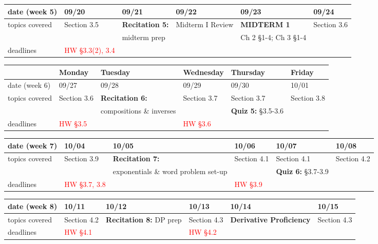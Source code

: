 \documentclass[11pt,fleqn]{article}
\begin{document}
\vfill
\begin{tabularx}{\textwidth}{|X|| X | X | X | X | X |}
\hline
\rowcolor{gray!20}
date (week 5)&09/20&09/21&09/22&09/23&09/24\\ \hline
topics covered&Section 3.5&\textbf{Recitation 5:} &Midterm I Review&\textcolor{dcyan}{\textbf{MIDTERM 1}}&Section 3.6\\
&&midterm prep&&Ch 2 \S 1-4; Ch 3 \S 1-4&\\ \hline
deadlines&\textcolor{red}{HW \S 3.3(2), 3.4}&&&& \\  \hline \hline
\end{tabularx}
\vfill
\newpage

\begin{tabularx}{\textwidth}{|X|| X | X | X | X | X |}
\hline
&Monday & Tuesday & Wednesday & Thursday & Friday \\
\hline \hline
\rowcolor{gray!20}
date (week 6)&09/27&09/28&09/29&09/30&10/01\\ \hline
topics covered&Section 3.6&\textbf{Recitation 6:}&Section 3.7&Section 3.7&Section 3.8\\ 
&&compositions \& inverses&&\textbf{Quiz 5:} \S 3.5-3.6&\\ \hline
deadlines&\textcolor{red}{HW \S3.5}&&\textcolor{red}{HW \S 3.6}&& \\ \hline
\end{tabularx}
\vfill
\begin{tabularx}{\textwidth}{|X|| X | X | X | X | X |}
\hline
\rowcolor{gray!20}
date (week 7)&10/04&10/05&10/06&10/07&10/08\\ \hline
topics covered&Section 3.9&\textbf{Recitation 7:}&Section 4.1&Section 4.1&Section 4.2\\ 
&&exponentials \& word problem set-up&&\textbf{Quiz 6:} \S 3.7-3.9&\\ \hline
deadlines&\textcolor{red}{HW \S 3.7, 3.8}& &\textcolor{red}{HW \S 3.9}&& \\\hline 
\end{tabularx}
\vfill
\begin{tabularx}{\textwidth}{|X|| X | X | X | X | X |}
\hline
\rowcolor{gray!20}
date (week 8)&10/11&10/12&10/13&10/14&10/15\\ \hline
topics covered&Section 4.2&\textbf{Recitation 8:} DP prep&Section 4.3&\textcolor{dcyan}{\textbf{Derivative Proficiency}}&Section 4.3\\ 
 \hline
deadlines&\textcolor{red}{HW \S 4.1}&&\textcolor{red}{HW \S 4.2}&& \\ \hline 
\end{tabularx}
\end{document}
